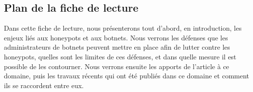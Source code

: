 \subsection{Plan de la fiche de lecture}

Dans cette fiche de lecture, nous présenterons tout d'abord, en introduction,
les enjeux liés aux honeypots et aux botnets. Nous verrons les défenses que les
administrateurs de botnets peuvent mettre en place afin de lutter contre les
honeypots, quelles sont les limites de ces défenses, et dans quelle mesure il
est possible de les contourner. Nous verrons ensuite les apports de l'article à
ce domaine, puis les travaux récents qui ont été publiés dans ce domaine et
comment ils se raccordent entre eux.

